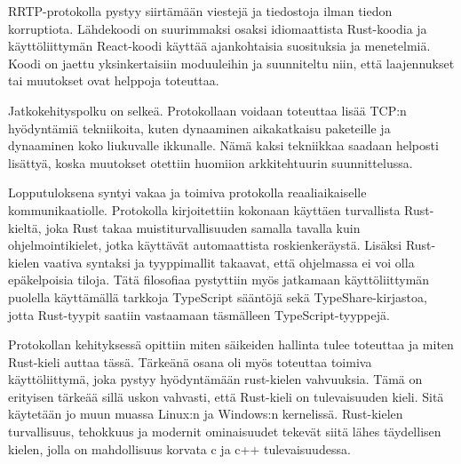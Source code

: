 \documentclass[a4paper,12pt]{article}
\begin{document}
    RRTP-protokolla pystyy siirtämään viestejä ja tiedostoja ilman tiedon korruptiota. Lähdekoodi on suurimmaksi osaksi idiomaattista Rust-koodia ja käyttöliittymän React-koodi käyttää ajankohtaisia suosituksia ja menetelmiä.
    Koodi on jaettu yksinkertaisiin moduuleihin ja suunniteltu niin, että laajennukset tai muutokset ovat helppoja toteuttaa.\par

    Jatkokehityspolku on selkeä. Protokollaan voidaan toteuttaa lisää TCP:n hyödyntämiä tekniikoita, kuten dynaaminen aikakatkaisu paketeille ja dynaaminen koko liukuvalle ikkunalle. Nämä kaksi tekniikkaa saadaan helposti lisättyä, koska muutokset otettiin huomiion arkkitehtuurin suunnittelussa.\par

    Lopputuloksena syntyi vakaa ja toimiva protokolla reaaliaikaiselle kommunikaatiolle. Protokolla kirjoitettiin kokonaan käyttäen turvallista Rust-kieltä, joka 
    Rust takaa muistiturvallisuuden samalla tavalla kuin ohjelmointikielet, jotka käyttävät automaattista roskienkeräystä. Lisäksi Rust-kielen vaativa syntaksi ja
    tyyppimallit takaavat, että ohjelmassa ei voi olla epäkelpoisia tiloja.
    Tätä filosofiaa pystyttiin myös jatkamaan käyttöliittymän puolella käyttämällä
    tarkkoja TypeScript sääntöjä sekä TypeShare-kirjastoa, jotta Rust-tyypit saatiin vastaamaan täsmälleen TypeScript-tyyppejä.\par

    Protokollan kehityksessä opittiin miten säikeiden hallinta tulee toteuttaa ja miten Rust-kieli auttaa tässä. Tärkeänä osana oli myös toteuttaa toimiva käyttöliittymä, joka pystyy hyödyntämään rust-kielen vahvuuksia. Tämä on erityisen tärkeää sillä
    uskon vahvasti, että Rust-kieli on tulevaisuuden kieli. Sitä käytetään jo muun muassa Linux:n ja Windows:n kernelissä. Rust-kielen turvallisuus, tehokkuus ja modernit ominaisuudet tekevät siitä lähes täydellisen kielen, jolla on mahdollisuus korvata c ja c++ tulevaisuudessa.


    \newpage
    \printbibliography
\end{document}
